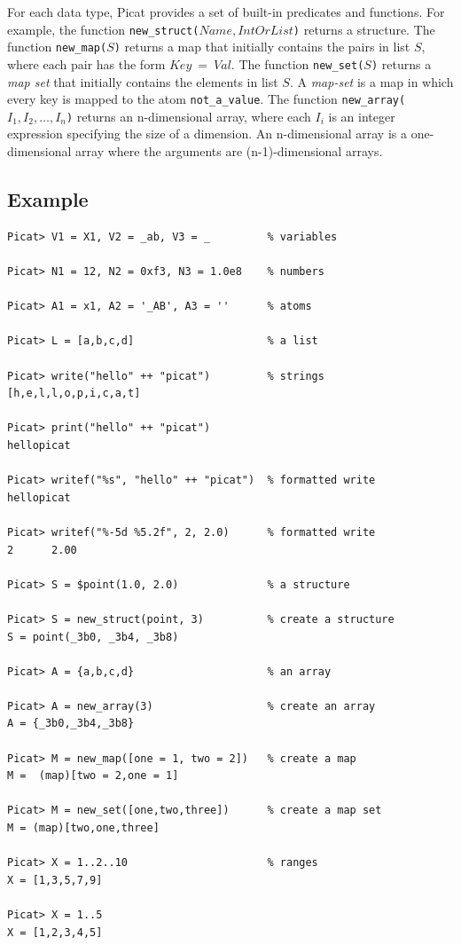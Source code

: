 For each data type, Picat provides a set of built-in predicates and functions. For example, the function \texttt{new\_struct($Name, IntOrList$)} returns a structure. The function \texttt{new\_map($S$)} returns a map that initially contains the pairs in list $S$, where each pair has the form $Key\ =\ Val$. The function \texttt{new\_set($S$)} returns a \emph{map set} that initially contains the elements in list $S$. A \emph{map-set}  is a map in which every key is mapped to the atom \texttt{not\_a\_value}. The function \texttt{new\_array($I_1, I_2, \ldots, I_{n}$)} returns an n-dimensional array, where each $I_i$ is an integer expression specifying the size of a dimension. An n-dimensional array is a one-dimensional array where the arguments are (n-1)-dimensional arrays. 

\subsection*{Example}
\begin{verbatim}
Picat> V1 = X1, V2 = _ab, V3 = _         % variables

Picat> N1 = 12, N2 = 0xf3, N3 = 1.0e8    % numbers

Picat> A1 = x1, A2 = '_AB', A3 = ''      % atoms

Picat> L = [a,b,c,d]                     % a list

Picat> write("hello" ++ "picat")         % strings
[h,e,l,l,o,p,i,c,a,t]

Picat> print("hello" ++ "picat")         
hellopicat

Picat> writef("%s", "hello" ++ "picat")  % formatted write
hellopicat

Picat> writef("%-5d %5.2f", 2, 2.0)      % formatted write
2      2.00

Picat> S = $point(1.0, 2.0)              % a structure

Picat> S = new_struct(point, 3)          % create a structure   
S = point(_3b0, _3b4, _3b8)

Picat> A = {a,b,c,d}                     % an array

Picat> A = new_array(3)                  % create an array
A = {_3b0,_3b4,_3b8}

Picat> M = new_map([one = 1, two = 2])   % create a map
M =  (map)[two = 2,one = 1]

Picat> M = new_set([one,two,three])      % create a map set
M = (map)[two,one,three]

Picat> X = 1..2..10                      % ranges
X = [1,3,5,7,9]

Picat> X = 1..5
X = [1,2,3,4,5]
\end{verbatim}

